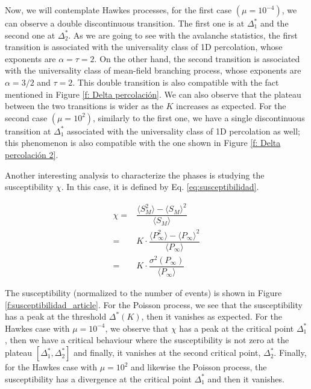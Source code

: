 Now, we will contemplate Hawkes processes, for the first case $\left( \mu=10^{-4} \right)$, we can observe a double discontinuous transition. The first one is at $\Delta_1^*$ and the second one at 
$\Delta_2^*$. As we are going to see with the avalanche statistics, the first transition is associated with the universality class of 1D percolation, whose exponents are $\alpha=\tau=2$. 
On the other hand, the second transition is associated with the universality class of mean-field branching process, whose exponents are $\alpha=3/2$ and $\tau=2$. This double transition 
is also compatible with the fact mentioned in Figure \ref{f: Delta percolación}. We can also observe that the plateau between the two transitions is wider as the $K$ increases as expected.
For the second case $\left( \mu=10^2 \right)$, similarly to the first one, we have a single discontinuous transition at $\Delta_1^*$ associated with the universality class of 1D percolation
as well; this phenomenon is also compatible with the one shown in Figure \ref{f: Delta percolación 2}.

Another interesting analysis to characterize the phases is studying the susceptibility $\chi$. In this case, it is defined by Eq. \ref{eq:susceptibilidad}.

\begin{equation}
    \begin{split}
        \chi =& \dfrac{ \langle S_M^2 \rangle - \langle S_M \rangle^2 }{\langle S_M \rangle}\\
             =& K\cdot \dfrac{\langle P_{\infty}^2 \rangle - \langle P_{\infty} \rangle^2}{\langle P_{\infty} \rangle}\\
             =& K\cdot \dfrac{\sigma^2\left( P_\infty \right)}{\langle P_{\infty} \rangle}
    \end{split}
    \label{eq:susceptibilidad}
\end{equation}

The susceptibility (normalized to the number of events) is shown in Figure \ref{f:susceptibilidad_article}. For the Poisson process, we see that the susceptibility has a peak at the
threshold $\Delta^*(K)$, then it vanishes as expected. For the Hawkes case with $\mu=10^{-4}$, we observe that $\chi$ has a peak at the critical point $\Delta_1^*$, then 
we have a critical behaviour where the susceptibility is not zero at the plateau $[\Delta_1^*,\Delta_2^*]$ and finally, it vanishes at the second critical point, $\Delta_2^*$. Finally, 
for the Hawkes case with $\mu=10^2$ and likewise the Poisson process, the susceptibility has a divergence at the critical point $\Delta_1^*$ and then it vanishes. 

